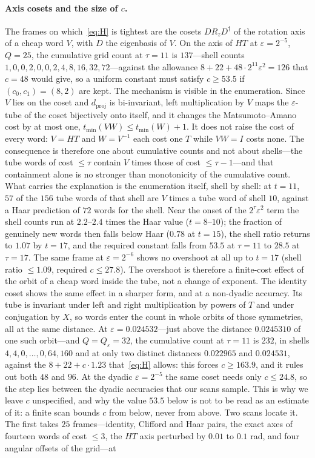 \documentclass[aps,prx,twocolumn,superscriptaddress,nofootinbib,longbibliography]{revtex4-2}
\theoremstyle{plain}
\theoremstyle{definition}
\theoremstyle{remark}
\newcommand{\dproj}{d_{\mathrm{proj}}}
\begin{document}
\paragraph{Axis cosets and the size of $c$.} The frames on which~\eqref{eq:H} is tightest are the cosets $DR_zD^\dagger$ of the rotation axis of a cheap word $V$, with $D$ the eigenbasis of $V$. On the axis of $HT$ at $\varepsilon=2^{-5}$, $Q=25$, the cumulative grid count at $\tau=11$ is $137$---shell counts $1,0,0,2,0,0,2,4,8,16,32,72$---against the allowance $8+22+48\cdot2^{11}\varepsilon^2=126$ that $c=48$ would give, so a uniform constant must satisfy $c\ge53.5$ if $(c_0,c_1)=(8,2)$ are kept. The mechanism is visible in the enumeration. Since $V$ lies on the coset and $\dproj$ is bi-invariant, left multiplication by $V$ maps the $\varepsilon$-tube of the coset bijectively onto itself, and it changes the Matsumoto--Amano cost by at most one, $t_{\min}(VW)\le t_{\min}(W)+1$. It does not raise the cost of every word: $V=HT$ and $W=V^{-1}$ each cost one $T$ while $VW=I$ costs none. The consequence is therefore one about cumulative counts and not about shells---the tube words of cost $\le\tau$ contain $V$ times those of cost $\le\tau-1$---and that containment alone is no stronger than monotonicity of the cumulative count. What carries the explanation is the enumeration itself, shell by shell: at $t=11$, $57$ of the $156$ tube words of that shell are $V$ times a tube word of shell $10$, against a Haar prediction of $72$ words for the shell. Near the onset of the $2^\tau\varepsilon^2$ term the shell counts run at $2.2$--$2.4$ times the Haar value ($t=8$--$10$); the fraction of genuinely new words then falls below Haar ($0.78$ at $t=15$), the shell ratio returns to $1.07$ by $t=17$, and the required constant falls from $53.5$ at $\tau=11$ to $28.5$ at $\tau=17$. The same frame at $\varepsilon=2^{-6}$ shows no overshoot at all up to $t=17$ (shell ratio $\le1.09$, required $c\le27.8$). The overshoot is therefore a finite-cost effect of the orbit of a cheap word inside the tube, not a change of exponent. The identity coset shows the same effect in a sharper form, and at a non-dyadic accuracy. Its tube is invariant under left and right multiplication by powers of $T$ and under conjugation by $X$, so words enter the count in whole orbits of those symmetries, all at the same distance. At $\varepsilon=0.024532$---just above the distance $0.0245310$ of one such orbit---and $Q=Q_\varepsilon=32$, the cumulative count at $\tau=11$ is $232$, in shells $4,4,0,\dots,0,64,160$ and at only two distinct distances $0.022965$ and $0.024531$, against the $8+22+c\cdot1.23$ that~\eqref{eq:H} allows: this forces $c\ge163.9$, and it rules out both $48$ and $96$. At the dyadic $\varepsilon=2^{-5}$ the same coset needs only $c\le24.8$, so the step lies between the dyadic accuracies that our scans sample. This is why we leave $c$ unspecified, and why the value $53.5$ below is not to be read as an estimate of it: a finite scan bounds $c$ from below, never from above. Two scans locate it. The first takes $25$ frames---identity, Clifford and Haar pairs, the exact axes of fourteen words of cost $\le3$, the $HT$ axis perturbed by $0.01$ to $0.1$ rad, and four angular offsets of the grid---at 
\end{document}

